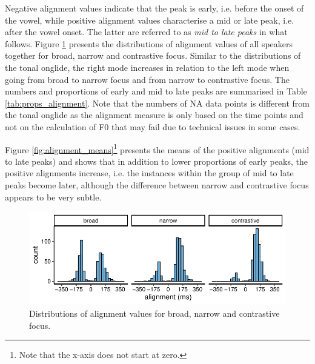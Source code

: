 Negative alignment values indicate that the peak is early, i.e. before the onset of the vowel, while positive alignment values characterise a mid or late peak, i.e. after the vowel onset. The latter are referred to as \emph{mid to late peaks} in what follows. Figure \ref{fig:alignment_distributions_within} presents the distributions of alignment values of all speakers together for broad, narrow and contrastive focus. Similar to the distributions of the tonal onglide, the right mode increases in relation to the left mode when going from broad to narrow focus and from narrow to contrastive focus. The numbers and proportions of early and mid to late peaks are summarised in Table \ref{tab:props_alignment}. Note that the numbers of NA data points is different from the tonal onglide as the alignment measure is only based on the time points and not on the calculation of F0 that may fail due to technical issues in some cases.

Figure \ref{fig:alignment_means}\footnote{Note that the x-axis does not start at zero.} presents the means of the positive alignments (mid to late peaks) and shows that in addition to lower proportions of early peaks, the positive alignments increase, i.e. the instances within the group of mid to late peaks become later, although the difference between narrow and contrastive focus appears to be very subtle.

\begin{figure}
\includegraphics[width=\textwidth]{figures/ch6/alignment_distribution_within.pdf}
\caption{Distributions of alignment values for broad, narrow and contrastive focus.}
\label{fig:alignment_distributions_within}
\end{figure}

